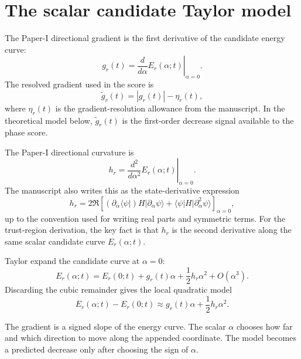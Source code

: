 \documentclass[10pt,twocolumn]{article}
\newcommand{\ket}[1]{\lvert #1\rangle}
\newcommand{\bra}[1]{\langle #1\rvert}
\begin{document}
\section{The scalar candidate Taylor model}

The Paper-I directional gradient is the first derivative of the candidate energy curve:
\begin{equation}
g_r(t)=
\left.\frac{d}{d\alpha}E_r(\alpha;t)\right|_{\alpha=0}.
\label{eq:g_r_def}
\end{equation}
The resolved gradient used in the score is
\begin{equation}
\widetilde g_r(t)=|g_r(t)|-\eta_r(t),
\label{eq:resolved_g_def}
\end{equation}
where \(\eta_r(t)\) is the gradient-resolution allowance from the manuscript. In the theoretical model below, \(\widetilde g_r(t)\) is the first-order decrease signal available to the phase score.

The Paper-I directional curvature is
\begin{equation}
h_r
=
\left.\frac{d^2}{d\alpha^2}E_r(\alpha;t)\right|_{\alpha=0}.
\label{eq:h_r_derivative_def}
\end{equation}
The manuscript also writes this as the state-derivative expression
\begin{equation}
h_r=
2\Re\left[
(\partial_\alpha\bra{\psi})H\ket{\partial_\alpha\psi}
+\bra{\psi}H\ket{\partial_\alpha^2\psi}
\right]_{\alpha=0},
\label{eq:h_r_state_def}
\end{equation}
up to the convention used for writing real parts and symmetric terms. For the trust-region derivation, the key fact is that \(h_r\) is the second derivative along the same scalar candidate curve \(E_r(\alpha;t)\).

Taylor expand the candidate curve at \(\alpha=0\):
\begin{equation}
E_r(\alpha;t)
=E_r(0;t)+g_r(t)\alpha+\frac12h_r\alpha^2+O(\alpha^3).
\label{eq:taylor_Er}
\end{equation}
Discarding the cubic remainder gives the local quadratic model
\begin{equation}
E_r(\alpha;t)-E_r(0;t)
\approx g_r(t)\alpha+\frac12h_r\alpha^2.
\label{eq:local_scalar_model}
\end{equation}

\begin{intuitionbox}
The gradient is a signed slope of the energy curve. The scalar \(\alpha\) chooses how far and which direction to move along the appended coordinate. The model becomes a predicted decrease only after choosing the sign of \(\alpha\).
\end{intuitionbox}
\end{document}
